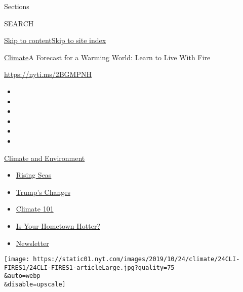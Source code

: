 Sections

SEARCH

\protect\hyperlink{site-content}{Skip to
content}\protect\hyperlink{site-index}{Skip to site index}

\href{/section/climate}{Climate}\textbar{}A Forecast for a Warming
World: Learn to Live With Fire

\url{https://nyti.ms/2BGMPNH}

\begin{itemize}
\item
\item
\item
\item
\item
\item
\end{itemize}

\href{https://www.nytimes.com/section/climate?action=click\&pgtype=Article\&state=default\&region=TOP_BANNER\&context=storylines_menu}{Climate
and Environment}

\begin{itemize}
\tightlist
\item
  \href{https://www.nytimes.com/2020/07/30/climate/sea-level-inland-floods.html?action=click\&pgtype=Article\&state=default\&region=TOP_BANNER\&context=storylines_menu}{Rising
  Seas}
\item
  \href{https://www.nytimes.com/interactive/2020/climate/trump-environment-rollbacks.html?action=click\&pgtype=Article\&state=default\&region=TOP_BANNER\&context=storylines_menu}{Trump's
  Changes}
\item
  \href{https://www.nytimes.com/interactive/2020/04/19/climate/climate-crash-course-1.html?action=click\&pgtype=Article\&state=default\&region=TOP_BANNER\&context=storylines_menu}{Climate
  101}
\item
  \href{https://www.nytimes.com/interactive/2018/08/30/climate/how-much-hotter-is-your-hometown.html?action=click\&pgtype=Article\&state=default\&region=TOP_BANNER\&context=storylines_menu}{Is
  Your Hometown Hotter?}
\item
  \href{https://www.nytimes.com/newsletters/climate-change?action=click\&pgtype=Article\&state=default\&region=TOP_BANNER\&context=storylines_menu}{Newsletter}
\end{itemize}

\texttt{[image: https://static01.nyt.com/images/2019/10/24/climate/24CLI-FIRES1/24CLI-FIRES1-articleLarge.jpg?quality=75\\\&auto=webp\\\&disable=upscale]}

